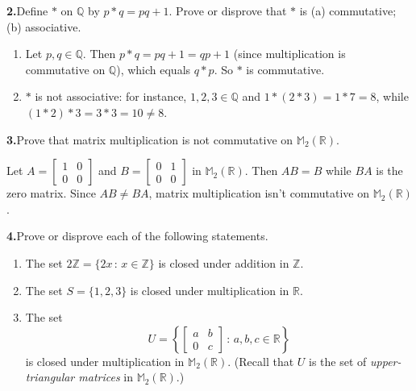 \documentclass[10pt,]{book}
\theoremstyle{plain}
\theoremstyle{definition}
\theoremstyle{definition}
\theoremstyle{definition}
\theoremstyle{definition}
\numberwithin{equation}{section}
\def\Z{\mathbb{Z}}
\def\R{\mathbb{R}}
\def\Q{\mathbb{Q}}
\def\M{\mathbb{M}}
\newcommand{\amp}{&}
\begin{document}
\par\smallskip
\noindent\textbf{2.}\quad{}Define \(*\) on \(\Q\) by \(p*q=pq+1\). Prove or disprove that \(*\) is (a) commutative; (b) associative.%
\par\smallskip
\leavevmode%
\begin{enumerate}[label=(\alph*)]
\item\hypertarget{li-66}{}Let \(p,q\in \Q\).  Then \(p*q=pq+1=qp+1\) (since multiplication is commutative on \(\Q\)), which equals \(q*p\).  So \(*\) is commutative.%
\item\hypertarget{li-67}{}\(*\) is not associative: for instance, \(1,2,3\in \Q\) and \(1*(2*3)=1*7=8\), while \((1*2)*3=3*3=10\neq 8\).%
\end{enumerate}
\par\smallskip
\noindent\textbf{3.}\quad{}Prove that matrix multiplication is not commutative on \(\M_2(\R)\).%
\par\smallskip
Let \(A=\begin{bmatrix}1 \amp 0 \\ 0 \amp 0\end{bmatrix}\) and \(B = \begin{bmatrix}0 \amp 1 \\ 0 \amp 0\end{bmatrix}\) in \(\M_2(\R)\). Then \(AB=B\) while \(BA\) is the zero matrix. Since \(AB\neq BA\), matrix multiplication isn't commutative on \(\M_2(\R)\).%
\par\smallskip
\noindent\textbf{4.}\quad{}Prove or disprove each of the following statements. \leavevmode%
\begin{enumerate}[label=(\alph*)]
\item\hypertarget{li-68}{}The set \(2\Z=\{2x\,:\,x\in \Z\}\) is closed under addition in \(\Z\).%
\item\hypertarget{li-69}{}The set \(S=\{1,2,3\}\) is closed under multiplication in \(\R\).%
\item\hypertarget{li-70}{}The set%
\begin{equation*}
U=\left\{
\begin{bmatrix}
a    \amp    b\\
0 \amp c \end{bmatrix}\,:\,a,b,c\in \R\right\}
\end{equation*}
is closed under multiplication in \(\M_2(\R)\). (Recall that \(U\) is  the set of \emph{upper-triangular matrices} in \(\M_2(\R)\).)%
\end{enumerate}
%
\par\smallskip
\end{document}
